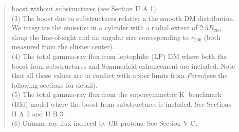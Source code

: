 \documentclass[10pt,aps,pra,reprint,amsmath,amsfonts,amssymb,showpacs,nofootinbib,floatfix]{revtex4-1}
\newcommand{\Fermi}{{\em Fermi}\xspace}
\newcommand{\rmn}{\mathrm}
\newcommand{\Kp}{\rmn{K}^\prime}
\newcommand{\rvir}{r_{200}}
\begin{document}
\begin{table}
\begin{minipage}{2.0\columnwidth}
\begin{quote}
  boost without substructures (see Section II A 1).\\
  (3) The boost due to substructures relative a the smooth DM
  distribution. We integrate the emission in a cylinder with a radial
  extent of $2.5 R_{200}$ along the line-of-sight and an angular size
  corresponding to $\rvir$ (both measured from the cluster center).\\
  (4) The total gamma-ray flux from leptophilic (LP) DM where both the
  boost from substructures and Sommerfeld enhancement are
  included. Note that all these values are in conflict with upper limits from
  \Fermi (see the following sections for detail).\\
  (5) The total gamma-ray flux from the supersymmetric $\Kp$ benchmark (BM)
  model where the boost from substructures is included. See Sections II A 2 and II B 3.\\
  (6) Gamma-ray flux induced by CR protons. See Section V C.
 \label{tab:flux_tab}
  \end{quote}
\end{minipage}
\end{table}
\end{document}
